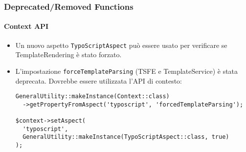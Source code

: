 
\begin{frame}[fragile]
	\frametitle{Deprecated/Removed Functions}
	\framesubtitle{Context API}

	\lstset{basicstyle=\tiny\ttfamily}

	\begin{itemize}

		\item Un nuovo aspetto \texttt{TypoScriptAspect} può essere usato per verificare se
			TemplateRendering è stato forzato.

		\item L'impostazione \texttt{forceTemplateParsing} (TSFE e TemplateService) è stata deprecata.
			Dovrebbe essere utilizzata l'API di contesto:

\begin{lstlisting}
GeneralUtility::makeInstance(Context::class)
  ->getPropertyFromAspect('typoscript', 'forcedTemplateParsing');

$context->setAspect(
  'typoscript',
  GeneralUtility::makeInstance(TypoScriptAspect::class, true)
);
\end{lstlisting}

	\end{itemize}

\end{frame}


